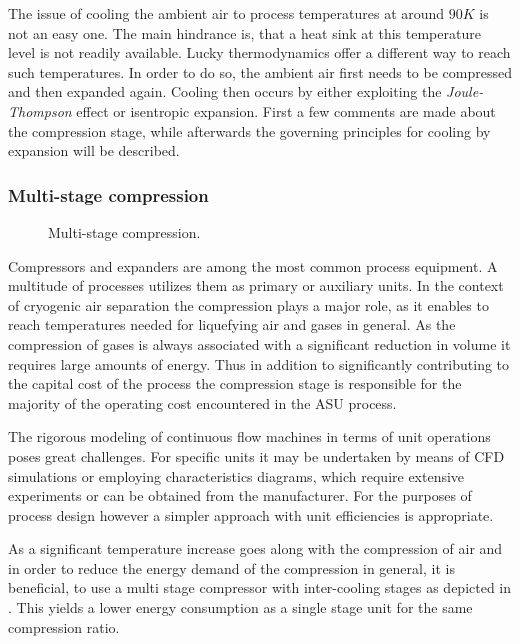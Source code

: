 
    The issue of cooling the ambient air to process temperatures at around $90 K$ is not an easy
    one. The main hindrance is, that a heat sink at this temperature level is not readily available.
    Lucky thermodynamics offer a different way to reach such temperatures. In order to do so,
    the ambient air first needs to be compressed and then expanded again. Cooling then occurs
    by either exploiting the \emph{Joule-Thompson} effect or isentropic expansion. First a few
    comments are made about the compression stage, while afterwards the governing principles
    for cooling by expansion will be described.

    \subsubsection{Multi-stage compression}
        \begin{figure}
            \center
            
            \caption{Multi-stage compression.}
            \label{fig:multi_stage_compression}
        \end{figure}

        Compressors and expanders are among the most common process equipment. A multitude of processes
        utilizes them as primary or auxiliary units. In the context of cryogenic air separation the
        compression plays a major role, as it enables to reach temperatures needed for liquefying
        air and gases in general. As the compression of gases is always associated with a significant
        reduction in volume it requires large amounts of energy. Thus in addition to significantly
        contributing to the capital cost of the process the compression stage is responsible for
        the majority of the operating cost encountered in the ASU process.

        The rigorous modeling of continuous flow machines in terms of unit operations poses great challenges.
        For specific units it may be undertaken by means of CFD simulations or employing characteristics diagrams,
        which require extensive experiments or can be obtained from the manufacturer.
        For the purposes of process design however a simpler approach with unit efficiencies is appropriate.

        As a significant temperature increase goes along with the compression of air and in order to reduce
        the energy demand of the compression in general, it is beneficial, to use a multi stage compressor with
        inter-cooling stages as depicted in . This yields a lower energy consumption
        as a single stage unit for the same compression ratio.

